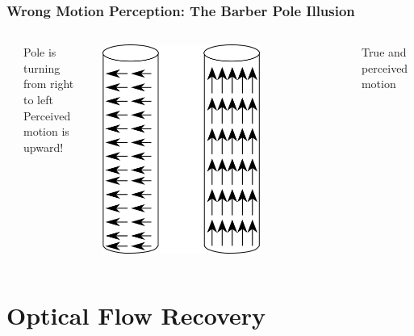 \documentclass[10pt]{beamer}
\begin{document}
\begin{frame}
  \frametitle{Wrong Motion Perception: The Barber Pole Illusion}
  \begin{columns}
  \begin{center}
  \end{center}
  Pole is turning from right to left\\
  Perceived motion is upward!
  \begin{center}
    \includegraphics[width=0.65\textwidth]{FIGURES/barberpolemotion}
  \end{center}
  True and perceived motion
  \end{columns}
  
\end{frame}




\section{Optical Flow Recovery}
\label{sec:optrec}
\end{document}
